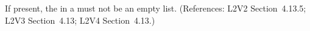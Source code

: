 If present, the  in a \KineticLaw must not
be an empty list.  (References: L2V2 Section~4.13.5; L2V3
Section~4.13; L2V4 Section~4.13.)
